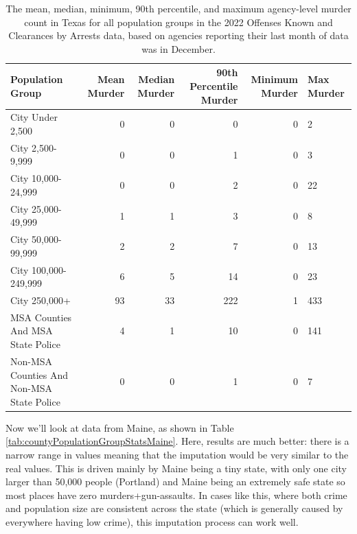 \documentclass[
  12pt,
  openany]{book}
\begin{document}
\begin{longtable}[t]{lrrrrl}
\caption{\label{tab:countyPopulationGroupStatsTexas}The mean, median, minimum, 90th percentile, and maximum agency-level murder count in Texas for all population groups in the 2022 Offenses Known and Clearances by Arrests data, based on agencies reporting their last month of data was in December.}\\
\toprule
Population Group & Mean Murder & Median Murder & 90th Percentile Murder & Minimum Murder & Max Murder\\
\midrule
City Under 2,500 & 0 & 0 & 0 & 0 & 2\\
City 2,500-9,999 & 0 & 0 & 1 & 0 & 3\\
City 10,000-24,999 & 0 & 0 & 2 & 0 & 22\\
City 25,000-49,999 & 1 & 1 & 3 & 0 & 8\\
City 50,000-99,999 & 2 & 2 & 7 & 0 & 13\\
\addlinespace
City 100,000-249,999 & 6 & 5 & 14 & 0 & 23\\
City 250,000+ & 93 & 33 & 222 & 1 & 433\\
MSA Counties And MSA State Police & 4 & 1 & 10 & 0 & 141\\
Non-MSA Counties And Non-MSA State Police & 0 & 0 & 1 & 0 & 7\\
\bottomrule
\end{longtable}

Now we'll look at data from Maine, as shown in Table \ref{tab:countyPopulationGroupStatsMaine}. Here, results are much better: there is a narrow range in values meaning that the imputation would be very similar to the real values. This is driven mainly by Maine being a tiny state, with only one city larger than 50,000 people (Portland) and Maine being an extremely safe state so most places have zero murders+gun-assaults. In cases like this, where both crime and population size are consistent across the state (which is generally caused by everywhere having low crime), this imputation process can work well.
\end{document}
